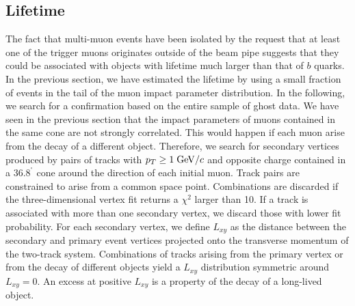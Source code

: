 \documentclass[aps,prd,preprint,floatfix,nofootinbib,superscriptaddress,showpacs,amssymb]{revtex4}
\def\deg{^\circ}
\begin{document}
\subsection{Lifetime}
\label{sec:ss-lifetime}
 The fact that multi-muon events have been isolated by the request that at 
 least one of the trigger muons originates outside of the beam pipe suggests
 that they could be associated with objects with  lifetime much larger than
 that of $b$ quarks. In the previous section, we have estimated the lifetime
 by using a small fraction of events in the tail of the muon impact parameter
 distribution. In the following, we search for a confirmation based on
 the entire sample of ghost data. We have seen in the previous section
 that  the impact parameters of muons contained in the same cone are not 
 strongly correlated. This would happen if each muon arise from the decay of
 a different object. Therefore, we search for secondary vertices produced by
 pairs of tracks with $p_T \geq 1 \; {\rm GeV/}c$ and opposite charge contained in
 a $36.8^{\deg}$ cone around the direction of each initial muon. Track pairs
 are constrained to arise from a common space point. Combinations are
 discarded if the three-dimensional vertex fit returns a $\chi^2$ larger
 than 10. If a track is associated with  more than one secondary vertex, 
 we discard those with lower fit probability. For each secondary vertex,
 we define $L_{xy}$ as the distance between the secondary and primary 
 event vertices projected onto the transverse momentum of the two-track
 system. Combinations of tracks arising from the primary vertex or from 
 the decay of different objects yield a $L_{xy}$ distribution symmetric
 around $L_{xy}=0$. An excess at positive $L_{xy}$ is a property of the
 decay of a long-lived object.
\end{document}
